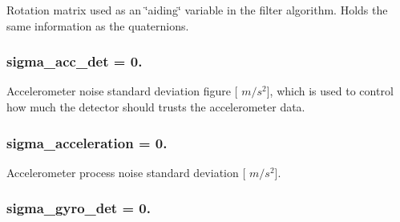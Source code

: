 \-Rotation matrix used as an \char`\"{}aiding\char`\"{} variable in the filter algorithm. \-Holds the same information as the quaternions. 

\hypertarget{group__nav__eq_ga519e1c68258a371960249e09c24e9943}{
\subsubsection[{sigma\-\_\-acc\-\_\-det}]{ {\bf sigma\-\_\-acc\-\_\-det} = 0.}}
\label{group__nav__eq_ga519e1c68258a371960249e09c24e9943}


\-Accelerometer noise standard deviation figure \mbox{[} $m/s^2$\mbox{]}, which is used to control how much the detector should trusts the accelerometer data. 

\hypertarget{group__nav__eq_ga5add0877d1169e9e1d4dd227c1bcc83d}{
\subsubsection[{sigma\-\_\-acceleration}]{ {\bf sigma\-\_\-acceleration} = 0.}}
\label{group__nav__eq_ga5add0877d1169e9e1d4dd227c1bcc83d}


\-Accelerometer process noise standard deviation \mbox{[} $m/s^2$\mbox{]}. 

\hypertarget{group__nav__eq_ga779a972b079accc690d64bcd7bef3c91}{
\subsubsection[{sigma\-\_\-gyro\-\_\-det}]{ {\bf sigma\-\_\-gyro\-\_\-det} = 0.}}
\label{group__nav__eq_ga779a972b079accc690d64bcd7bef3c91}


